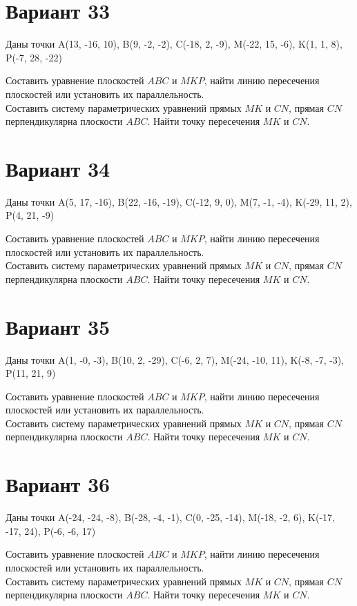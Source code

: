 \documentclass[11pt]{article}
\begin{document}
\section*{Вариант 33}
Даны точки A(13, -16, 10), B(9, -2, -2), C(-18, 2, -9), M(-22, 15, -6), K(1, 1, 8), P(-7, 28, -22)

Составить уравнение плоскостей $ABC$ и $MKP$, найти линию пересечения плоскостей или установить их параллельность.\\
Составить систему параметрических уравнений прямых $MK$ и $CN$, прямая $CN$ перпендикулярна плоскости $ABC$. Найти точку пересечения $MK$ и $CN$.

\section*{Вариант 34}
Даны точки A(5, 17, -16), B(22, -16, -19), C(-12, 9, 0), M(7, -1, -4), K(-29, 11, 2), P(4, 21, -9)

Составить уравнение плоскостей $ABC$ и $MKP$, найти линию пересечения плоскостей или установить их параллельность.\\
Составить систему параметрических уравнений прямых $MK$ и $CN$, прямая $CN$ перпендикулярна плоскости $ABC$. Найти точку пересечения $MK$ и $CN$.

\section*{Вариант 35}
Даны точки A(1, -0, -3), B(10, 2, -29), C(-6, 2, 7), M(-24, -10, 11), K(-8, -7, -3), P(11, 21, 9)

Составить уравнение плоскостей $ABC$ и $MKP$, найти линию пересечения плоскостей или установить их параллельность.\\
Составить систему параметрических уравнений прямых $MK$ и $CN$, прямая $CN$ перпендикулярна плоскости $ABC$. Найти точку пересечения $MK$ и $CN$.

\section*{Вариант 36}
Даны точки A(-24, -24, -8), B(-28, -4, -1), C(0, -25, -14), M(-18, -2, 6), K(-17, -17, 24), P(-6, -6, 17)

Составить уравнение плоскостей $ABC$ и $MKP$, найти линию пересечения плоскостей или установить их параллельность.\\
Составить систему параметрических уравнений прямых $MK$ и $CN$, прямая $CN$ перпендикулярна плоскости $ABC$. Найти точку пересечения $MK$ и $CN$.
\end{document}
